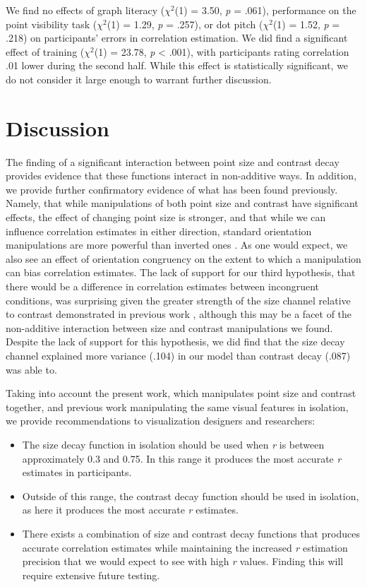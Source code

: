 \documentclass[manuscript, review, anonymous, screen]{acmart}
\providecommand{\tightlist}{%
  \setlength{\itemsep}{0pt}\setlength{\parskip}{0pt}}\usepackage{longtable,booktabs,array}
\begin{document}
We find no effects of graph literacy (\(\chi^2\)(1) = 3.50, \emph{p} =
.061), performance on the point visibility task (\(\chi^2\)(1) = 1.29,
\emph{p} = .257), or dot pitch (\(\chi^2\)(1) = 1.52, \emph{p} = .218)
on participants' errors in correlation estimation. We did find a
significant effect of training (\(\chi^2\)(1) = 23.78, \emph{p}
\textless{} .001), with participants rating correlation .01 lower during
the second half. While this effect is statistically significant, we do
not consider it large enough to warrant further discussion.

\hypertarget{sec-discussion}{%
\section{Discussion}\label{sec-discussion}}

The finding of a significant interaction between point size and contrast
decay provides evidence that these functions interact in non-additive
ways. In addition, we provide further confirmatory evidence of what has
been found previously. Namely, that while manipulations of both point
size and contrast have significant effects, the effect of changing point
size is stronger, and that while we can influence correlation estimates
in either direction, standard orientation manipulations are more
powerful than inverted ones \citep{strain_2023, strain_2023b}. As one
would expect, we also see an effect of orientation congruency on the
extent to which a manipulation can bias correlation estimates. The lack
of support for our third hypothesis, that there would be a difference in
correlation estimates between incongruent conditions, was surprising
given the greater strength of the size channel relative to contrast
demonstrated in previous work \citep{strain_2023, strain_2023b},
although this may be a facet of the non-additive interaction between
size and contrast manipulations we found. Despite the lack of support
for this hypothesis, we did find that the size decay channel explained
more variance (.104) in our model than contrast decay (.087) was able
to.

Taking into account the present work, which manipulates point size and
contrast together, and previous work manipulating the same visual
features in isolation, we provide recommendations to visualization
designers and researchers:

\begin{itemize}
\tightlist
\item
  The size decay function in isolation should be used when \emph{r} is
  between approximately 0.3 and 0.75. In this range it produces the most
  accurate \emph{r} estimates in participants.
\item
  Outside of this range, the contrast decay function should be used in
  isolation, as here it produces the most accurate \emph{r} estimates.
\item
  There exists a combination of size and contrast decay functions that
  produces accurate correlation estimates while maintaining the
  increased \emph{r} estimation precision that we would expect to see
  with high \emph{r} values. Finding this will require extensive future
  testing.
\end{itemize}
\end{document}
